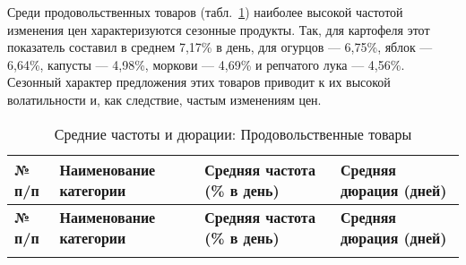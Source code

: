 Среди продовольственных товаров (табл.~\ref{tab:products}) наиболее высокой частотой изменения цен характеризуются сезонные продукты. Так, для картофеля этот показатель составил в среднем 7,17\% в день, для огурцов — 6,75\%, яблок — 6,64\%, капусты — 4,98\%, моркови — 4,69\% и репчатого лука — 4,56\%. Сезонный характер предложения этих товаров приводит к их высокой волатильности и, как следствие, частым изменениям цен. 

\begin{longtable}{|p{1cm}|p{8.5cm}|p{3.5cm}|p{3cm}|} %
	\caption{Средние частоты и дюрации: Продовольственные товары} \label{tab:products} \\
	\hline
	\textbf{№ п/п} & \textbf{Наименование категории} & \textbf{Средняя частота (\% в день)} & \textbf{Средняя дюрация (дней)} \\
	\hline
	\hline
	\endfirsthead
	
	\hline
	\textbf{№ п/п} & \textbf{Наименование категории} & \textbf{Средняя частота (\% в день)} & \textbf{Средняя дюрация (дней)} \\
	\hline
	\hline
	\endhead
	
	\hline
	\endfoot
	
	\hline
	\endlastfoot
	

\end{longtable}
